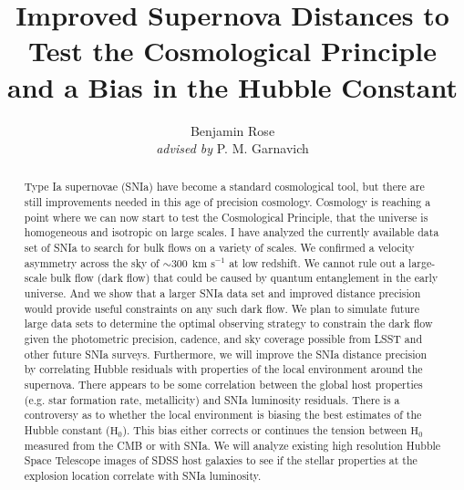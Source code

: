 \documentclass[apj, iop]{emulateapj}
\newcommand{\sn}{SNIa}
\newcommand{\Hubble}{\ensuremath{\text{H}_0}}
\newcommand{\kms}{\ensuremath{~\text{km s}^{-1}}}
\begin{document}
\title{Improved Supernova Distances to Test the Cosmological Principle \\and a Bias in the Hubble Constant}

\author{Benjamin Rose \\{\it advised by} P. M. Garnavich}



\begin{abstract} 

Type Ia supernovae (\sn{}) have become a standard cosmological tool, but there
are still improvements needed in this age of precision cosmology.  Cosmology  is
reaching a point where we can now start to test the Cosmological Principle, that
the universe is homogeneous and isotropic on large scales.  I have analyzed the
currently available data set of \sn{} to search for bulk flows on a variety of
scales. We confirmed a velocity asymmetry across the sky of $\sim 300~\kms{}$ at
low redshift. We cannot rule out a large-scale bulk flow (dark flow) that could
be caused by quantum entanglement in the early universe. And we show that a
larger \sn{} data set and improved distance precision would provide useful
constraints on any such dark flow. We plan to simulate future large data sets to
determine the optimal observing strategy to constrain the dark flow given the
photometric precision, cadence, and sky coverage possible from LSST and other
future \sn{} surveys.  Furthermore, we will improve the \sn{} distance precision
by correlating Hubble residuals with properties of the local environment around
the supernova. There appears to be some correlation between the global host
properties (e.g. star formation rate, metallicity) and \sn{} luminosity
residuals. There is a controversy as to whether the local environment is biasing
the best estimates of the Hubble constant (\Hubble{}). This bias either corrects
or continues the tension between \Hubble{} measured from the CMB or with \sn{}.
We will analyze existing high resolution Hubble Space Telescope images of SDSS
host galaxies to see if the stellar properties at the explosion location
correlate with \sn{} luminosity.

\end{abstract}
\end{document}
